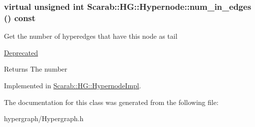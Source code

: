 \hypertarget{class_scarab_1_1_h_g_1_1_hypernode_a4b1a4ffaa8a8b0295763673e6d86d693}{
\subsubsection[{num\_\-in\_\-edges}]{\setlength{\rightskip}{0pt plus 5cm}virtual unsigned int Scarab::HG::Hypernode::num\_\-in\_\-edges () const}}
\label{class_scarab_1_1_h_g_1_1_hypernode_a4b1a4ffaa8a8b0295763673e6d86d693}
Get the number of hyperedges that have this node as tail \begin{Desc}
\item[\hyperlink{deprecated__deprecated000008}{Deprecated}]\end{Desc}
\begin{DoxyReturn}{Returns}
The number 
\end{DoxyReturn}


Implemented in \hyperlink{class_scarab_1_1_h_g_1_1_hypernode_impl_a9a13a37fcece16603ec4bf3f364e6fcc}{Scarab::HG::HypernodeImpl}.



The documentation for this class was generated from the following file:\begin{DoxyCompactItemize}
\item 
hypergraph/Hypergraph.h\end{DoxyCompactItemize}
